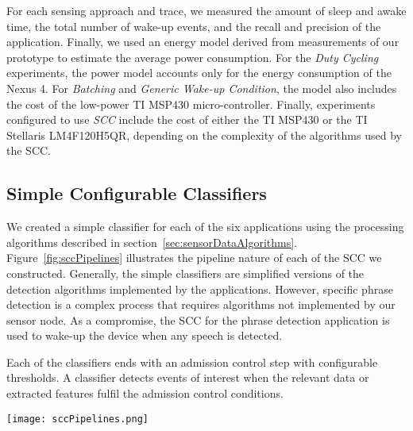 For each sensing approach and trace, we measured the amount of sleep
and awake time, the total number of wake-up events, and the recall and
precision of the application.  Finally, we used an energy model
derived from measurements of our prototype to estimate
the average power consumption.  For the {\em Duty Cycling} experiments, 
the power model accounts only for the energy
consumption of the Nexus 4.  For {\em Batching} and {\em Generic Wake-up Condition},
the model also includes the cost of the low-power TI MSP430
micro-controller.  Finally, experiments configured to use {\em SCC} include the cost of 
either the TI MSP430 or the TI Stellaris
LM4F120H5QR, depending on the complexity of the algorithms used by the SCC.

\subsection{Simple Configurable Classifiers}
\label{sec:classifiers}

We created a simple classifier for each of the six applications using
the processing algorithms described in section~\ref{sec:sensorDataAlgorithms}. 
Figure~\ref{fig:sccPipelines} illustrates the pipeline nature of each of the 
SCC we constructed.  Generally, the simple classifiers are simplified versions
of the detection algorithms implemented by the applications.  However, specific
phrase detection is a complex process that requires algorithms not implemented
by our sensor node.  As a compromise, the SCC for the phrase detection application
is used to wake-up the device when any speech is detected.

Each of the classifiers ends with an admission control step with configurable 
thresholds.  A classifier detects events of interest when the relevant
data or extracted features fulfil the admission control conditions. 

\begin{figure*}[t]
	\texttt{[image: sccPipelines.png]}
	\caption{SCC pipelines for each of the applications.}
	\label{fig:sccPipelines}
\end{figure*}



